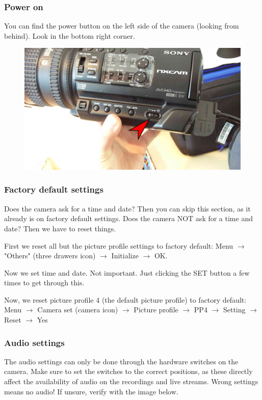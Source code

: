 \documentclass{article}
\begin{document}
\subsubsection{Power on}
You can find the power button on the left side of the camera (looking from behind). Look in the bottom right corner.

\begin{figure}[H]
  \centering
\includegraphics[width = 120mm]{Sony03.jpg}
\end{figure}

\subsubsection{Factory default settings}
Does the camera ask for a time and date? Then you can skip this section, as it already is on factory default settings.
Does the camera NOT ask for a time and date? Then we have to reset things.

First we reset all but the picture profile settings to factory default:
Menu $\rightarrow$ "Others" (three drawers icon) $\rightarrow$ Initialize $\rightarrow$ OK.

Now we set time and date. Not important. Just clicking the SET button a few times to get through this.

Now, we reset picture profile 4 (the default picture profile) to factory default:
Menu $\rightarrow$ Camera set (camera icon) $\rightarrow$ Picture profile $\rightarrow$ PP4 $\rightarrow$ Setting $\rightarrow$ Reset $\rightarrow$ Yes

\subsubsection{Audio settings}
The audio settings can only be done through the hardware switches on the camera.
Make sure to set the switches to the correct positions, as these directly affect the availability of audio on the recordings and live streams. Wrong settings means no audio!
If unsure, verify with the image below.
\end{document}
